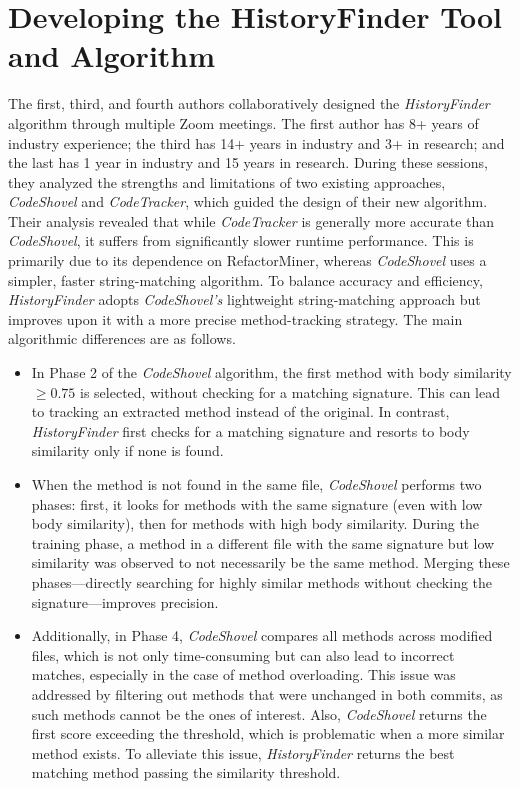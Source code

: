 \section{Developing the HistoryFinder Tool and Algorithm}
\label{sec:history-finder-algorithm}

The first, third, and fourth authors collaboratively designed the \textit{HistoryFinder} algorithm through multiple Zoom meetings. The first author has 8+ years of industry experience; the third has 14+ years in industry and 3+ in research; and the last has 1 year in industry and 15 years in research. During these sessions, they analyzed the strengths and limitations of two existing approaches, \textit{CodeShovel} and \textit{CodeTracker}, which guided the design of their new algorithm. Their analysis revealed that while \textit{CodeTracker} is generally more accurate than \textit{CodeShovel}, it suffers from significantly slower runtime performance. This is primarily due to its dependence on RefactorMiner, whereas \textit{CodeShovel} uses a simpler, faster string-matching algorithm. To balance accuracy and efficiency, \textit{HistoryFinder} adopts \textit{CodeShovel’s} lightweight string-matching approach but improves upon it with a more precise method-tracking strategy. The main algorithmic differences are as follows.
\begin{itemize}
    \item In Phase 2 of the \textit{CodeShovel} algorithm, the first method with body similarity $\ge0.75$ is selected, without checking for a matching signature. This can lead to tracking an extracted method instead of the original. In contrast, \textit{HistoryFinder} first checks for a matching signature and resorts to body similarity only if none is found.
\item When the method is not found in the same file, \textit{CodeShovel} performs two phases: first, it looks for methods with the same signature (even with low body similarity), then for methods with high body similarity. During the training phase, a method in a different file with the same signature but low similarity was observed to not necessarily be the same method. Merging these phases---directly searching for highly similar methods without checking the signature---improves precision.

\item Additionally, in Phase 4, \textit{CodeShovel} compares all methods across modified files, which is not only time-consuming but can also lead to incorrect matches, especially in the case of method overloading. This issue was addressed by filtering out methods that were unchanged in both commits, as such methods cannot be the ones of interest. Also, \textit{CodeShovel} returns the first score exceeding the threshold, which is problematic when a more similar method exists. To alleviate this issue, \textit{HistoryFinder} returns the best matching method passing the similarity threshold.
\end{itemize}

